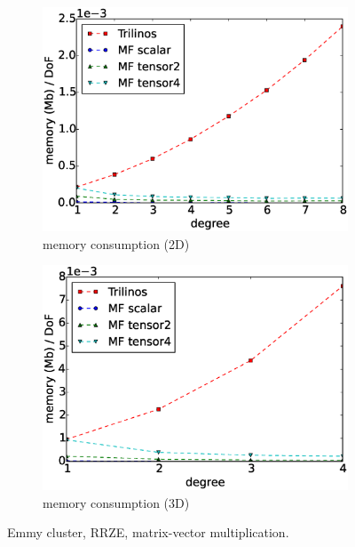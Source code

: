\documentclass[preprint,12pt,times]{elsarticle}
\begin{document}
\begin{figure}[!ht]
\begin{subfigure}[b]{0.49\textwidth}
      \includegraphics[width=\textwidth]{Emmy_RRZE_memory2d.eps}
      \caption{memory consumption (2D)}
      \label{fig:benchmark_miehe_Emmy_memory2}
  \end{subfigure}
  \begin{subfigure}[b]{0.49\textwidth}
    \centering
    \includegraphics[width=\textwidth]{Emmy_RRZE_memory3d.eps}
    \caption{memory consumption (3D)}
    \label{fig:benchmark_miehe_Emmy_memory3}
  \end{subfigure}
  \caption{Emmy cluster, RRZE, matrix-vector multiplication.}%
  \label{fig:benchmark_miehe_Emmy}
\end{figure}
\end{document}
